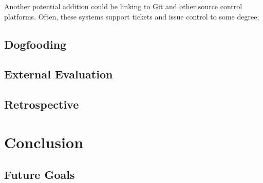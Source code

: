 \documentclass[a4paper]{l3proj}
\begin{document}
Another potential addition could be linking to Git and other source control platforms. Often, these systems support tickets and issue control to some degree; 

\section{Dogfooding}
\label{dogfooding}


\section{External Evaluation}
\label{externalEvaluation}


\section{Retrospective}
\label{retrospective}


\chapter{Conclusion}
\label{conclusion}


\section{Future Goals}
\label{futureGoals}


% 
% 
\end{document}
